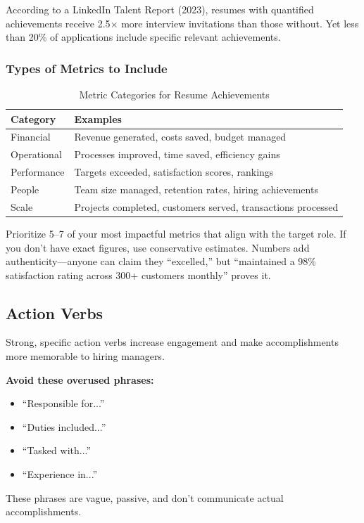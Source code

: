 \documentclass[11pt,a4paper]{article}
\begin{document}
\begin{keystat}
According to a LinkedIn Talent Report (2023), resumes with quantified achievements receive 2.5$\times$ more interview invitations than those without. Yet less than 20\% of applications include specific relevant achievements.
\end{keystat}

\subsubsection{Types of Metrics to Include}

\begin{table}[h]
\centering
\begin{tabular}{@{}ll@{}}
\toprule
\textbf{Category} & \textbf{Examples} \\
\midrule
Financial & Revenue generated, costs saved, budget managed \\
Operational & Processes improved, time saved, efficiency gains \\
Performance & Targets exceeded, satisfaction scores, rankings \\
People & Team size managed, retention rates, hiring achievements \\
Scale & Projects completed, customers served, transactions processed \\
\bottomrule
\end{tabular}
\caption{Metric Categories for Resume Achievements}
\end{table}

\begin{bestpractice}
Prioritize 5--7 of your most impactful metrics that align with the target role. If you don't have exact figures, use conservative estimates. Numbers add authenticity---anyone can claim they ``excelled,'' but ``maintained a 98\% satisfaction rating across 300+ customers monthly'' proves it.
\end{bestpractice}

\subsection{Action Verbs}

Strong, specific action verbs increase engagement and make accomplishments more memorable to hiring managers.

\begin{warning}
\textbf{Avoid these overused phrases:}
\begin{itemize}[noitemsep]
    \item ``Responsible for...''
    \item ``Duties included...''
    \item ``Tasked with...''
    \item ``Experience in...''
\end{itemize}
These phrases are vague, passive, and don't communicate actual accomplishments.
\end{warning}
\end{document}
